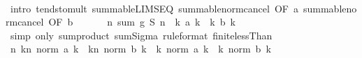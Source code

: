 \begin{isabellebody}
\ \ \ \ \isamarkupfalse%
\ {\isacharparenleft}{\kern0pt}intro\ tendsto{\isacharunderscore}{\kern0pt}mult\ summable{\isacharunderscore}{\kern0pt}LIMSEQ\ summable{\isacharunderscore}{\kern0pt}norm{\isacharunderscore}{\kern0pt}cancel\ {\isacharbrackleft}{\kern0pt}OF\ a{\isacharbrackright}{\kern0pt}\ summable{\isacharunderscore}{\kern0pt}norm{\isacharunderscore}{\kern0pt}cancel\ {\isacharbrackleft}{\kern0pt}OF\ b{\isacharbrackright}{\kern0pt}{\isacharparenright}{\kern0pt}\isanewline
\ \ \isamarkupfalse%
\ \isamarkupfalse%
\ {}{\isacharcolon}{\kern0pt}\ {\isachardoublequoteopen}{\isacharparenleft}{\kern0pt}{\isasymlambda}n{\isachardot}{\kern0pt}\ sum\ {\isacharquery}{\kern0pt}g\ {\isacharparenleft}{\kern0pt}{\isacharquery}{\kern0pt}S{}\ n{\isacharparenright}{\kern0pt}{\isacharparenright}{\kern0pt}\ {\isasymlonglonglongrightarrow}\ {\isacharparenleft}{\kern0pt}{\isasymSum}k{\isachardot}{\kern0pt}\ a\ k{\isacharparenright}{\kern0pt}\ {\isacharasterisk}{\kern0pt}\ {\isacharparenleft}{\kern0pt}{\isasymSum}k{\isachardot}{\kern0pt}\ b\ k{\isacharparenright}{\kern0pt}{\isachardoublequoteclose}\isanewline
\ \ \ \ \isamarkupfalse%
\ {\isacharparenleft}{\kern0pt}simp\ only{\isacharcolon}{\kern0pt}\ sum{\isacharunderscore}{\kern0pt}product\ sum{\isachardot}{\kern0pt}Sigma\ {\isacharbrackleft}{\kern0pt}rule{\isacharunderscore}{\kern0pt}format{\isacharbrackright}{\kern0pt}\ finite{\isacharunderscore}{\kern0pt}lessThan{\isacharparenright}{\kern0pt}\isanewline
\isanewline
\ \ \isamarkupfalse%
\ {\isachardoublequoteopen}{\isacharparenleft}{\kern0pt}{\isasymlambda}n{\isachardot}{\kern0pt}\ {\isacharparenleft}{\kern0pt}{\isasymSum}k{\isacharless}{\kern0pt}n{\isachardot}{\kern0pt}\ norm\ {\isacharparenleft}{\kern0pt}a\ k{\isacharparenright}{\kern0pt}{\isacharparenright}{\kern0pt}\ {\isacharasterisk}{\kern0pt}\ {\isacharparenleft}{\kern0pt}{\isasymSum}k{\isacharless}{\kern0pt}n{\isachardot}{\kern0pt}\ norm\ {\isacharparenleft}{\kern0pt}b\ k{\isacharparenright}{\kern0pt}{\isacharparenright}{\kern0pt}{\isacharparenright}{\kern0pt}\ {\isasymlonglonglongrightarrow}\ {\isacharparenleft}{\kern0pt}{\isasymSum}k{\isachardot}{\kern0pt}\ norm\ {\isacharparenleft}{\kern0pt}a\ k{\isacharparenright}{\kern0pt}{\isacharparenright}{\kern0pt}\ {\isacharasterisk}{\kern0pt}\ {\isacharparenleft}{\kern0pt}{\isasymSum}k{\isachardot}{\kern0pt}\ norm\ {\isacharparenleft}{\kern0pt}b\ k{\isacharparenright}{\kern0pt}{\isacharparenright}{\kern0pt}{\isachardoublequoteclose}\isanewline
\ \ \ \ \isamarkupfalse%

\end{isabellebody}
